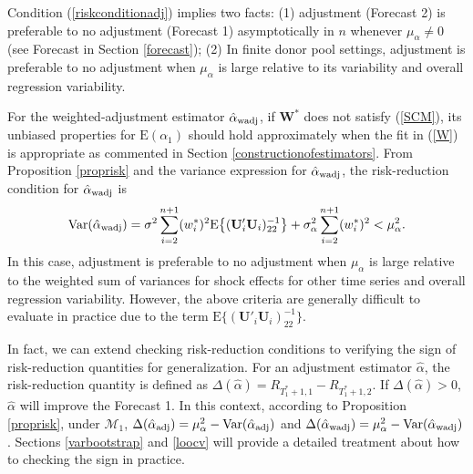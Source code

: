 \documentclass[11pt]{article}
\def\mbf#1{\mathbf{#1}} %
\def\mrm#1{\mathrm{#1}} %
\def\mc#1{\mathcal{#1}} %
\def\E#1{\mathrm{E}(#1)} %
\def\var#1{\mathrm{Var}(#1)} %
\theoremstyle{definition}
\begin{document}
Condition (\ref{riskconditionadj}) implies two facts: (1) adjustment (Forecast 2) is preferable to no adjustment (Forecast 1) asymptotically in $n$ whenever $\mu_{\alpha} \neq 0$ (see Forecast in Section \ref{forecast}); (2) In finite donor pool settings, adjustment is preferable to no adjustment when $\mu_{\alpha}$ is large relative to its variability and overall regression variability.   %

For the weighted-adjustment estimator $\hat{\alpha}_{\rm wadj}$, if  $\mathbf{W}^*$ does not satisfy (\ref{SCM}), its unbiased properties for $\E{\alpha_1}$ should hold approximately when the fit in (\ref{W}) is appropriate as commented in Section \ref{constructionofestimators}. From Proposition \ref{proprisk} and the variance expression for $\hat{\alpha}_{\rm wadj}$, the risk-reduction condition for $\hat{\alpha}_{\rm wadj}$ is
\begin{equation} \label{varwadj}
\var{\hat{\alpha}_{\rm wadj}}
 = \sigma^2\sum_{i=2}^{n+1}(w_i^*)^2\mrm{E}\big\{(\mbf{U}'_i\mbf{U}_i)^{-1}_{22}\big\}+\sigma^2_{\alpha}\sum_{i=2}^{n+1}(w_i^*)^2 < \mu_{\alpha}^2.
\end{equation}
In this case, adjustment is preferable to no adjustment when $\mu_{\alpha}$ is large relative to the weighted sum of variances for shock effects for other time series and overall regression variability.  However, the above criteria are generally difficult to evaluate in practice due to the term $\mrm{E}\big\{(\mbf{U}'_i\mbf{U}_i)^{-1}_{22}\big\}$. 


In fact, we can extend checking risk-reduction conditions to verifying the sign of risk-reduction quantities for generalization. For an adjustment estimator $\hat{\alpha}$, the risk-reduction quantity is defined as  $\Delta(\hat{\alpha})=R_{T_1^*+1,1}-R_{T_1^*+1,2}$. If $\Delta(\hat{\alpha})>0$, $\hat{\alpha}$ will improve the Forecast 1. In this context, according to Proposition \ref{proprisk}, under $\mc{M}_1$, $\Delta(\hat{\alpha}_{\rm adj})= \mu_{\alpha}^2-\var{\hat{\alpha}_{\rm adj}}$ and $\Delta(\hat{\alpha}_{\rm wadj})= \mu_{\alpha}^2-\var{\hat{\alpha}_{\rm wadj}}$. Sections \ref{varbootstrap} and \ref{loocv} will provide a detailed treatment about how to checking the sign  in practice.
\end{document}
